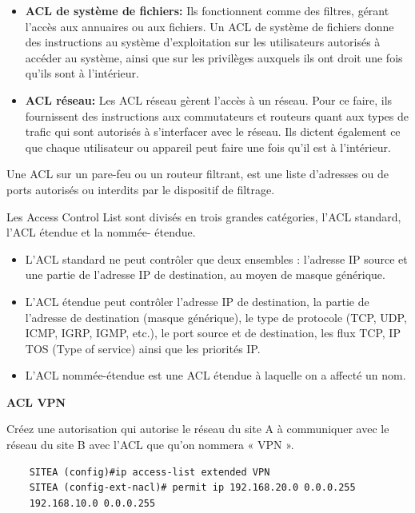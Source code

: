 \begin{itemize}
  \item \textbf{ACL de système de fichiers:} Ils fonctionnent comme des filtres, gérant l’accès aux annuaires ou aux fichiers. Un ACL de système de fichiers donne des instructions au système d’exploitation sur les utilisateurs autorisés à accéder au système, ainsi que sur les privilèges auxquels ils ont droit une fois qu’ils sont à l’intérieur.
  \item \textbf{ACL réseau:} Les ACL réseau gèrent l’accès à un réseau. Pour ce faire, ils fournissent des instructions aux commutateurs et routeurs quant aux types de trafic qui sont autorisés à s’interfacer avec le réseau. Ils dictent également ce que chaque utilisateur ou appareil peut faire une fois qu’il est à l’intérieur.
\end{itemize}

\noindent Une ACL sur un pare-feu ou un routeur filtrant, est une liste d'adresses ou de ports autorisés ou interdits par le
dispositif de filtrage.

\noindent Les Access Control List sont divisés en trois grandes catégories, l'ACL standard, l'ACL étendue et la nommée-
étendue.

\begin{itemize}
  \item L'ACL standard ne peut contrôler que deux ensembles : l'adresse IP source et une partie de l'adresse IP de destination, au moyen de masque générique.
  \item L'ACL étendue peut contrôler l'adresse IP de destination, la partie de l'adresse de destination (masque générique), le type de protocole (TCP, UDP, ICMP, IGRP, IGMP, etc.), le port source et de destination, les flux TCP, IP TOS (Type of service) ainsi que les priorités IP.
  \item L'ACL nommée-étendue est une ACL étendue à laquelle on a affecté un nom.
\end{itemize}

\vspace{0.5cm}

\noindent \textbf{ACL VPN}

\noindent Créez une autorisation qui autorise le réseau du site A à communiquer avec le réseau du site B avec l’ACL que qu’on nommera « VPN ».

\vspace{0.5cm}

\begin{center}
  \begin{verbatim}
    SITEA (config)#ip access-list extended VPN
    SITEA (config-ext-nacl)# permit ip 192.168.20.0 0.0.0.255
    192.168.10.0 0.0.0.255
  \end{verbatim}
\end{center}

